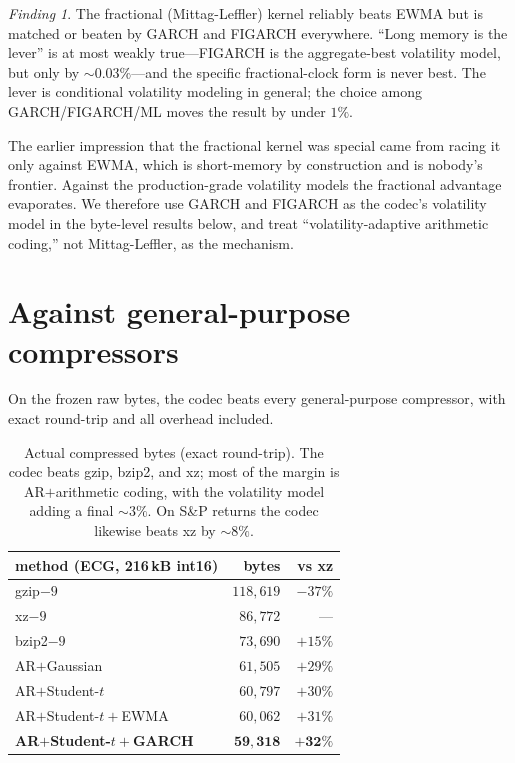 \documentclass[11pt,reqno]{amsart}
\theoremstyle{plain}
\theoremstyle{remark}
\newtheorem*{finding}{Finding}
\begin{document}
\begin{finding}
The fractional (Mittag-Leffler) kernel reliably beats EWMA but is matched or
beaten by GARCH and FIGARCH everywhere. ``Long memory is the lever'' is at most
weakly true---FIGARCH is the aggregate-best volatility model, but only by
$\sim0.03\%$---and the specific fractional-clock form is never best. The lever is
conditional volatility modeling in general; the choice among GARCH/FIGARCH/ML
moves the result by under $1\%$.
\end{finding}

The earlier impression that the fractional kernel was special came from racing it
only against EWMA, which is short-memory by construction and is nobody's frontier.
Against the production-grade volatility models the fractional advantage
evaporates. We therefore use GARCH and FIGARCH as the codec's volatility model
in the byte-level results below, and treat ``volatility-adaptive arithmetic
coding,'' not Mittag-Leffler, as the mechanism.

\section{Against general-purpose compressors}
\label{sec:general}

On the frozen raw bytes, the codec beats every general-purpose compressor,
with exact round-trip and all overhead included.

\begin{table}[h]
\centering\small
\begin{tabular}{lrr}
\toprule
method (ECG, 216\,kB int16) & bytes & vs xz\\
\midrule
gzip$-9$            & $118{,}619$ & $-37\%$\\
xz$-9$              & $86{,}772$  & ---\\
bzip2$-9$           & $73{,}690$  & $+15\%$\\
AR$+$Gaussian       & $61{,}505$  & $+29\%$\\
AR$+$Student-$t$    & $60{,}797$  & $+30\%$\\
AR$+$Student-$t+$EWMA & $60{,}062$ & $+31\%$\\
\textbf{AR$+$Student-$t+$GARCH} & $\mathbf{59{,}318}$ & $\mathbf{+32\%}$\\
\bottomrule
\end{tabular}
\caption{Actual compressed bytes (exact round-trip). The codec beats gzip,
bzip2, and xz; most of the margin is AR$+$arithmetic coding, with the volatility
model adding a final $\sim3\%$. On S\&P returns the codec likewise beats xz by
$\sim8\%$.}
\label{tab:general}
\end{table}
\end{document}
